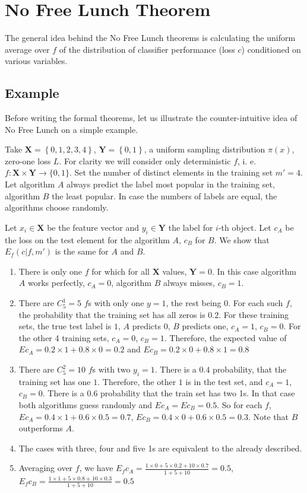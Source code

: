 \documentclass[a4paper]{article}
\begin{document}
\section{No Free Lunch Theorem}
The general idea behind the No Free Lunch theorems is calculating the
uniform average over $f$ of the distribution of classifier performance
(loss $c$) conditioned on various variables.

\subsection{Example}
Before writing the formal theorems, let us illustrate the
counter-intuitive idea of No Free Lunch on a simple example.

Take $\mathbf{X} = \left\{0,1,2,3,4\right\}$,
$\mathbf{Y} = \left\{0,1\right\}$, a uniform sampling distribution
$\pi(x)$, zero-one loss $L$.  For clarity we will consider only
deterministic $f$, i. e.
$f: \mathbf{X}\times \mathbf{Y} \rightarrow \{0,1\}$. Set the number of
distinct elements in the training set $m' = 4$. Let algorithm $A$
always predict the label most popular in the training set, algorithm
$B$ the least popular. In case the numbers of labels are equal, the
algorithms choose randomly.

Let $x_i \in \mathbf{X}$ be the feature vector and
$y_i \in \mathbf{Y}$ the label for $i$-th object. Let $c_A$ be the
loss on the test element for the algorithm $A$, $c_B$ for $B$. We show
that $E_f(c|f,m')$ is the same for $A$ and $B$.

\begin{enumerate}
\item There is only one $f$ for which for all $\mathbf{X}$ values,
  $\mathbf{Y}=0$. In this case algorithm $A$ works perfectly, $c_A=0$,
  algorithm $B$ always misses, $c_B=1$.
\item There are $C_5^1 = 5$ $f$s with only one $y = 1$, the rest being $0$. For
  each such $f$, the probability that the training set has all zeros
  is $0.2$. For these training sets, the true test label is $1$, $A$
  predicts $0$, $B$ predicts one, $c_A=1$, $c_B=0$. For the other 4
  training sets, $c_A=0$, $c_B=1$. Therefore, the expected value of
  $E c_A = 0.2\times 1 + 0.8 \times 0 = 0.2$ and
  $E c_B = 0.2\times 0 + 0.8 \times 1 = 0.8$
\item There are $C_5^2 = 10$ $f$s with two $y_i = 1$. There is a $0.4$
  probability, that the training set has one $1$. Therefore, the other
  $1$ is in the test set, and $c_A = 1$, $c_B = 0$. There is a $0.6$
  probability that the train set has two 1s. In that case both
  algorithms guess randomly and $E c_A = E c_B = 0.5$. So for each
  $f$, $E c_A = 0.4\times 1 + 0.6\times 0.5 = 0.7$,
  $E c_B = 0.4\times 0 + 0.6\times 0.5 = 0.3$. Note that $B$
  outperforms $A$.
\item The cases with three, four and five 1s are equivalent to the
  already described.
\item Averaging over $f$, we have
  $E_f c_A = \frac{1\times 0 + 5\times 0.2 + 10\times 0.7}{1+5+10} =
  0.5$,
  $E_f c_B = \frac{1\times 1 + 5\times 0.8 + 10\times 0.3}{1+5+10} =
  0.5$
\end{enumerate}
\end{document}
